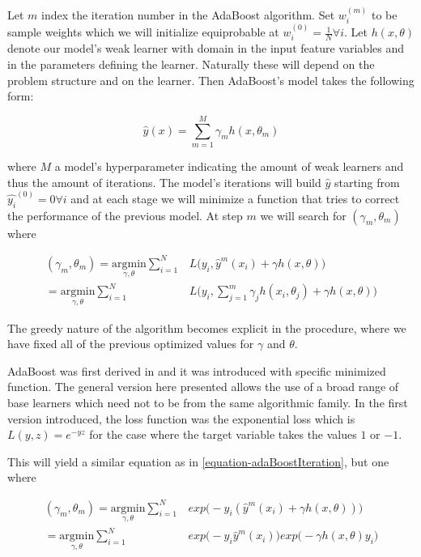 Let $m$ index the iteration number in the AdaBoost algorithm. Set $w^{(m)}_i$ to be sample weights which we will initialize equiprobable at $w^{(0)}_i = \frac{1}{N} \forall i$. Let $h(x,\theta)$  denote our model's weak learner with domain in the input feature variables and in the parameters defining the learner. Naturally these will depend on the problem structure and on the learner. Then AdaBoost's model takes the following form:

\begin{equation} \label{equation-adaBoostModel}
\hat{y}(x) = \sum_{m=1}^{M} \gamma_m h(x,\theta_m)
\end{equation}

where $M$ a model's hyperparameter indicating the amount of weak learners and thus the amount of iterations. The model's iterations will build $\hat{y}$ starting from $\hat{y_i}^{(0)}= 0 \forall i$ and at each stage we will minimize a function that tries to correct the performance of the previous model. At step $m$ we will search for $(\gamma_{m}, \theta_{m})$ where

\begin{equation} \label{equation-adaBoostIteration}
\begin{split}
(\gamma_{m}, \theta_{m}) = \underset{\gamma, \theta}{\mathrm{argmin}}  \sum_{i=1}^{N} & L\big( y_i,   \hat{y}^{m}(x_i) + \gamma h(x,\theta) \big) \\
= \underset{\gamma, \theta}{\mathrm{argmin}} \sum_{i=1}^{N}  & L\big( y_i,    \sum_{j=1}^{m} \gamma_j h(x_i,\theta_j) + \gamma h(x,\theta) \big) 
 \end{split}
\end{equation}

The greedy nature of the algorithm becomes explicit in the procedure, where we have fixed all of the previous optimized values for $\gamma$ and $\theta$. 

AdaBoost was first derived in \cite{schapire-adaBoost} and it was introduced with specific  minimized function. The general version here presented allows the use of a broad range of base learners which need not to be from the same algorithmic family. In the first version introduced, the loss function was the exponential loss which is $L(y,z) = e^{-yz}$ for the case where the target variable takes the values $1$ or $-1$.

This will yield a similar equation as in \ref{equation-adaBoostIteration}, but one where

\begin{equation} \label{equation-adaBoostExponentialIteration}
\begin{split}
(\gamma_{m}, \theta_{m}) = \underset{\gamma, \theta}{\mathrm{argmin}}  \sum_{i=1}^{N} & exp\big( -y_i  (\hat{y}^{m}(x_i) + \gamma h(x,\theta) )\big) \\
= \underset{\gamma, \theta}{\mathrm{argmin}}  \sum_{i=1}^{N} & exp\big( -y_i  \hat{y}^{m}(x_i)\big) exp\big(- \gamma h(x,\theta)y_i \big) 
\end{split}
\end{equation}

